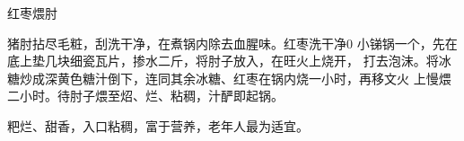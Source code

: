 \begin{recipe}{红枣煨肘}

\ingredients


\cooking

\step 猪肘拈尽毛粧，刮洗干净，在煮锅内除去血腥味。红枣洗干净0
\step 小锑锅一个，先在底上垫几块细瓷瓦片，掺水二斤，将肘子放入，在旺火上烧开，
打去泡沫。将冰糖炒成深黄色糖汁倒下，连同其余冰糖、红枣在锅内烧一小时，再移文火
上慢煨二小时。待肘子煨至炤、烂、粘稠，汁酽即起锅。

\notes

粑烂、甜香，入口粘稠，富于营养，老年人最为适宜。

\end{recipe}

